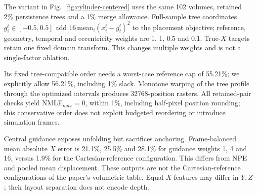 \documentclass{vgtc}                %
\begin{document}
The variant in Fig.~\ref{fig:cylinder-centered} uses the same 102 volumes, retained 2\% persistence trees and a 1\% merge allowance. Full-sample tree coordinates $g_i^t\in[-0.5,0.5]$ add $16\,\mathrm{mean}_i(x_i^t-g_i^t)^2$ to the placement objective; reference, geometry, temporal and eccentricity weights are 1, 1, 0.5 and 0.1. True-$X$ targets retain one fixed domain transform. This changes multiple weights and is not a single-factor ablation.

Its fixed tree-compatible order needs a worst-case reference cap of 55.21\%; we explicitly allow 56.21\%, including 1\% slack. Monotone warping of the tree profile through the optimized intervals produces 32768-position rasters. All retained-pair checks yield NMLE$_{max}=0$, within 1\%, including half-pixel position rounding; this conservative order does not exploit budgeted reordering or introduce simulation frames.

Central guidance exposes unfolding but sacrifices anchoring. Frame-balanced mean absolute $X$ error is 21.1\%, 25.5\% and 28.1\% for guidance weights 1, 4 and 16, versus 1.9\% for the Cartesian-reference configuration. This differs from NPE and pooled mean displacement. These outputs are not the Cartesian-reference configurations of the paper's volumetric table. Equal-$X$ features may differ in $Y,Z$; their layout separation does not encode depth.



\end{document}

